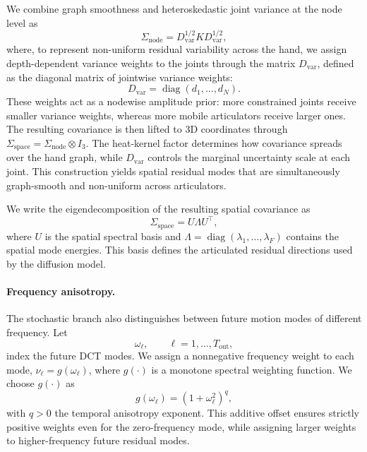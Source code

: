\documentclass[runningheads]{llncs}
\begin{document}
We combine graph smoothness and heteroskedastic joint variance at the node level as
\[
\Sigma_{\mathrm{node}}
=
D_{\mathrm{var}}^{1/2} K D_{\mathrm{var}}^{1/2},
\]
where, to represent non-uniform residual variability across the hand, we assign depth-dependent variance weights to the joints through the matrix $D_{\mathrm{var}}$, defined as the diagonal matrix of jointwise variance weights:
\[
D_{\mathrm{var}} = \operatorname{diag}(d_1,\dots,d_N).
\]
These weights act as a nodewise amplitude prior: more constrained joints receive smaller variance weights, whereas more mobile articulators receive larger ones.
The resulting covariance is then lifted to 3D coordinates through $\Sigma_{\mathrm{space}} = \Sigma_{\mathrm{node}} \otimes I_3$.
The heat-kernel factor determines how covariance spreads over the hand graph, while \(D_{\mathrm{var}}\) controls the marginal uncertainty scale at each joint. This construction yields spatial residual modes that are simultaneously graph-smooth and non-uniform across articulators.

We write the eigendecomposition of the resulting spatial covariance as
\[
\Sigma_{\mathrm{space}} = U \Lambda U^\top,
\]
where $U$ is the spatial spectral basis and $\Lambda = \operatorname{diag}(\lambda_1,\dots,\lambda_{F})$
contains the spatial mode energies. This basis defines the articulated residual directions used by the diffusion model.

\paragraph{Frequency anisotropy.}
The stochastic branch also distinguishes between future motion modes of different frequency. Let
\[
\omega_\ell, \qquad \ell=1,\dots,T_{\mathrm{out}},
\]
index the future DCT modes. We assign a nonnegative frequency weight to each mode, $\nu_\ell = g(\omega_\ell)$, where $g(\cdot)$ is a monotone spectral weighting function. We choose $g(\cdot)$ as 
\[
g(\omega_\ell) = (1 + \omega_\ell^2)^q,
\]
with $q>0$ the temporal anisotropy exponent. This additive offset ensures strictly positive weights even for the zero-frequency mode, while assigning larger weights to higher-frequency future residual modes.
\end{document}
